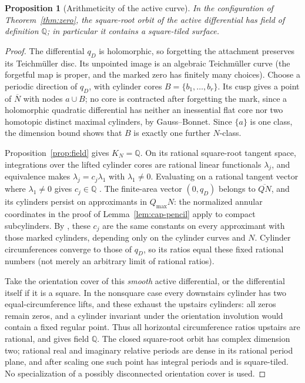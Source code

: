 \documentclass[11pt]{article}
\newcommand{\cl}[1]{\overline{#1}}
\newtheorem{proposition}[theorem]{Proposition}
\theoremstyle{remark}
\begin{document}
\begin{proposition}[Arithmeticity of the active curve]\label{prop:active-field}
In the configuration of Theorem~\ref{thm:zero}, the square-root
orbit of the active differential has field of definition
\(\mathbb Q\); in particular it contains a square-tiled surface.
\end{proposition}
\begin{proof}
The differential \(q_D\) is holomorphic, so forgetting the
attachment preserves its Teichm\"uller disc. Its unpointed
image is an algebraic Teichm\"uller curve (the forgetful map is
proper, and the marked zero has finitely many choices).
Choose a periodic direction of \(q_D\), with cylinder cores
\(B=\{b_1,\ldots,b_r\}\). Its cusp gives a point of \(\cl N\)
with nodes \(a\cup B\); no core is contracted after forgetting the
mark, since a holomorphic quadratic differential has neither an
inessential flat core nor two homotopic distinct maximal cylinders,
by Gauss--Bonnet. Since \(\{a\}\) is one class, the dimension bound
shows that \(B\) is exactly one further \(N\)-class.

Proposition~\ref{prop:field} gives \(K_N=\mathbb Q\).
On its rational square-root tangent space, integrations over
the lifted cylinder cores are rational linear functionals
\(\lambda_j\), and equivalence makes
\(\lambda_j=c_j\lambda_1\) with \(\lambda_1\ne0\).
Evaluating on a rational tangent vector where \(\lambda_1\ne0\)
gives \(c_j\in\mathbb Q\) \cite[Lemma 7.2]{WrightCylinder}.
The finite-area vector \((0,q_D)\) belongs to \(\cl{QN}\), and its
cylinders persist on approximants in \(Q_{\max}N\): the normalized
annular coordinates in the proof of Lemma~\ref{lem:cap-pencil}
apply to compact subcylinders. By \cite[Corollary 2.2]{AHW}, these
\(c_j\) are the same constants on every approximant with those
marked cylinders, depending only on the cylinder curves and \(N\).
Cylinder circumferences converge to those of \(q_D\), so its
ratios equal these fixed rational numbers (not merely an arbitrary
limit of rational ratios).

Take the orientation cover of this \emph{smooth} active
differential, or the differential itself if it is a square.
In the nonsquare case every downstairs cylinder has two
equal-circumference lifts, and these exhaust the upstairs
cylinders: all zeros remain zeros, and a cylinder invariant under
the orientation involution would contain a fixed regular point.
Thus all horizontal circumference ratios upstairs are rational, and
\cite[Theorem 1.9]{WrightCylinder} gives field \(\mathbb Q\). The
closed square-root orbit has complex dimension two; rational real
and imaginary relative periods are dense in its rational period
plane, and after scaling one such point has integral periods and is
square-tiled. No specialization of a possibly disconnected
orientation cover is used.
\end{proof}
\end{document}
